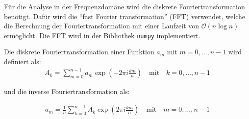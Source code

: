 \documentclass[main.tex]{subfiles}
\begin{document}
Für die Analyse in der Frequenzdomäne wird die diskrete Fouriertransformation
benötigt. Dafür wird die \enquote{fast Fourier transformation} (FFT) verwendet,
welche die Berechnung der Fouriertransformation mit einer Laufzeit von
$\mathcal{O}(n \log n)$ ermöglicht. Die FFT wird in der Bibliothek
\texttt{numpy} \cite{numpy-fft} implementiert.

Die diskrete Fouriertransformation einer Funktion $a_m$ mit $m = 0, \dots, n-1$
wird definiert als:
\begin{align}
    A_k = \sum_{m=0}^{n-1} a_m \exp(-2 \pi i\frac{ k m}{n}) \quad \text{mit}
    \quad k = 0, \dots, n-1
\end{align}

und die inverse Fouriertransformation als:

\begin{align}
    a_m = \frac{1}{n} \sum_{k=0}^{n-1} A_k \exp(2 \pi i\frac{ k m}{n}) \quad
    \text{mit} \quad m = 0, \dots, n-1
\end{align}


\end{document}
